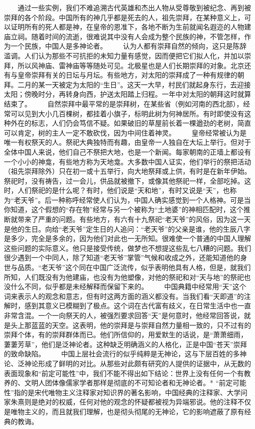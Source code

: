 \documentclass[12pt,oneside]{book}
\begin{document}
\begin{common-format}
　　通过一些实例，我们不难追溯古代英雄和杰出人物从受尊敬到被纪念、再到被崇拜的各个阶段。中国所有的神几乎都是死去的人，祖先崇拜，在某种意义上，可以证明所有的死人都是神，在皇帝的恩准下，各地不断为生前就闻名遐迩的人物建庙立祠。随着时间的流逝，很难说其中没有人会成为整个民族的神，不管怎样，作为一个民族，中国人是多神论者。 
　　认为人都有崇拜自然的倾向，这只是陈辞滥调。人们认为那些不可抗拒的未知力量有感觉，因而便把它们拟人化，并加以崇拜，所以风神庙、雷神庙等等随处可见。北极星也是人们长期崇拜的对象。北京还有与皇帝崇拜有关的日坛与月坛。有些地方，对太阳的崇拜成了一种有规律的朝拜。二月的某一天被定为太阳的“生日”。这天一大早，村民们就起身东行，去迎接太阳；傍晚时分，再转身向西，护送太阳踏上归程。一年中对太阳的朝拜这时就算结束了。 
　　自然崇拜中最平常的是崇拜树，在某些省（例如河南的西北部），经常可以见到大小几百棵树，都挂着小旗子，标明此树为何神居所。有时即使没有这种外在的标志，人们仍会笃信不疑。如果破旧的草屋前长着一棵遒劲的老树，简直可以肯定，树的主人一定不敢砍伐，因为中间住着神灵。 
　　皇帝经常被认为是唯一有权祭天的人。祭祀大典独特而有趣，由皇帝一人独自在大坛上举行。但对于全体中国人来说，他们自己不祭把大地，也是一个新闻。每家朝南的正墙上都设有一个小小的神龛，有些地方称为天地龛。大多数中国人证实，他们举行的祭把活动（祖先崇拜除外）只在初一或十五举行，向大地祭拜或上供，有时是在新年伊始。祭祀时，没有祷告，过一会儿，供品就被撤下，或像其他祭祀一样，全部吃掉。这时，人们祭祀的是什么呢？有时，他们说是“天和地”，有时又说是“天”，也称为“老天爷”。后一种称呼经常使人们认为，中国人确实感觉到一个人格神。可是当你知道，这个假想的“存在物”经常与另一个被称为“土地婆”的神相匹配时，这个推断就带来了严重的问题。有些地方，有六有十九祭祀“老天爷”的风俗，因为这一天是他的生日。向给“老天爷”定生日的人追问：“老天爷”的父亲是谁，他的生辰八字是多少，完全是多余的，因为他们对此也一无所知。很难使一个普通的中国人理解这些问题的实际意义。他只是接受传统，做梦也不想提这些乱七八糟的问题。我们很少遇到一个中同人，除了知道“老天爷”掌管”气候和收成之外，还能知道他的身世与品质。“老天爷”这个同在中国广泛流传，似乎表明他具有人格，但是，就我们所知，人们既没有为他建庙，也没有为他塑像，对他的祭祀和对“天与地”的祭祀也没什么不同，似乎都是未经解释而保留下来的。 
　　中国典籍中经常用“天”这个词来表示人的观念和意志，但有时这两方面的涵义都没有。当我们看“天即道”的注解时，感到其意义已模糊到了极点。这个词在古代富有歧义，在日常生活中也一直非常含混。一个一向祭天的人，被强烈要求回答“天”是何意时，他经常回答说，就是头上那蓝蓝的天空。这表明，他的崇拜是与崇拜自然力量相一致的，只不过有的崇拜个体，有的崇拜群体而已。他们所信仰的，用爱默生的话说，是“萧萧细雨，萋萋芳草”，他们是泛神论者。这种缺乏明确涵义的人格化，正是中国“苍天”崇拜的致命缺陷。 
　　中国上层社会流行的似乎纯粹是无神论，这与下层百姓的多神论、泛神论形成了鲜明的对比。从那些对此颇有研究的人提供的证据中，从无数的表面现象和“前定可能性”中，我们不能不得出如下结论：世界上没有任何一个有教养的、文明人团体像儒家学者那样是彻底的不可知论者和无神论者。* “前定可能性”指的是宋代唯物主义注释家对知识界的著名影响，中国经典的注释家、大学问家朱熹则是绝对的权威，任何对他的观念的怀疑都被视为异端邪说。他的注释不仅是唯物主义的，而且就我们理解，也是彻头彻尾的无神论，它的影响遮蔽了原有经典的教诲。 

\end{common-format}
\end{document}
